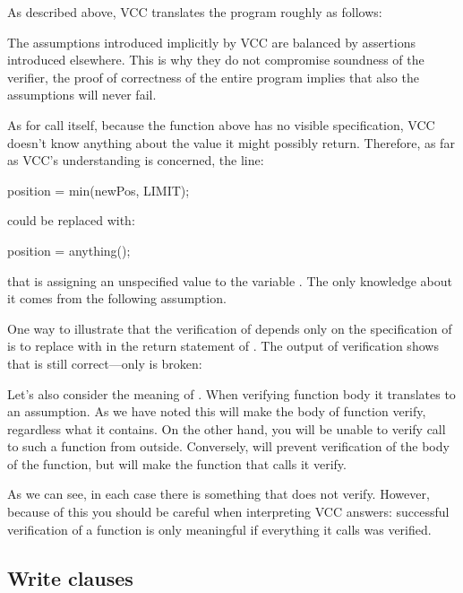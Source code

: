 As described above, VCC translates the program roughly as follows:

\begin{note}
The assumptions introduced implicitly by VCC are balanced by assertions
introduced elsewhere.
This is why they do not compromise soundness of the verifier,
\ie the proof of correctness of the entire program implies
that also the assumptions will never fail.
\end{note}

As for call itself, because the  function above has no
visible specification, VCC doesn't know anything about the value it
might possibly return.  Therefore, as far as VCC's understanding is
concerned, the line:
\begin{VCC}
position = min(newPos, LIMIT);
\end{VCC}
\noindent
could be replaced with:
\begin{VCC}
position = anything();
\end{VCC}
\noindent
that is assigning an unspecified value to the variable .
The only knowledge about it comes from the following assumption.

One way to illustrate that the verification of  
depends only on the specification of  is to 
replace \vcc{<} with \vcc{>} in the return statement of .
The output of verification shows that  is still correct---only 
 is broken:

Let's also consider the meaning of .
When verifying function body it translates to an assumption.
As we have noted this will make the body of function verify,
regardless what it contains.
On the other hand, you will be unable to verify call to such a function
from outside.
Conversely,  will prevent verification
of the body of the function, but will make the function that calls
it verify.

As we can see, in each case there is something that does not verify.
However, because of this you should be careful when interpreting
VCC answers: successful verification of a function is only meaningful
if everything it calls was verified.

\subsection{Write clauses}
\label{sect:writes}

